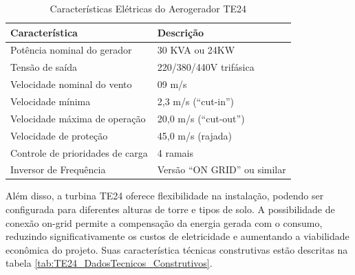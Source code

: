     \begin{table}[h]
        \centering
        \caption{Características Elétricas do Aerogerador TE24}
        \begin{tabular}{|l|l|}
            \toprule
            \textbf{Característica}                  & \textbf{Descrição}                                  \\ \midrule
            Potência nominal do gerador              & 30 KVA ou 24KW                                      \\
            Tensão de saída                          & 220/380/440V trifásica                              \\
            Velocidade nominal do vento              & 09 m/s                                              \\
            Velocidade mínima                        & 2,3 m/s (“cut-in”)                                  \\
            Velocidade máxima de operação            & 20,0 m/s (“cut-out”)                                \\
            Velocidade de proteção                   & 45,0 m/s (rajada)                                   \\
            Controle de prioridades de carga         & 4 ramais                                            \\
            Inversor de Frequência                   & Versão “ON GRID” ou similar                         \\ \bottomrule
        \end{tabular}
        \label{tab:TE24_DadosTecnicos_Eletrica}
    \end{table}
    
    \par Além disso, a turbina TE24 oferece flexibilidade na instalação, podendo ser configurada para diferentes alturas de torre e tipos de solo. A possibilidade de conexão on-grid permite a compensação da energia gerada com o consumo, reduzindo significativamente os custos de eletricidade e aumentando a viabilidade econômica do projeto. Suas característica técnicas construtivas estão descritas na tabela \ref{tab:TE24_DadosTecnicos_Construtivos}.

